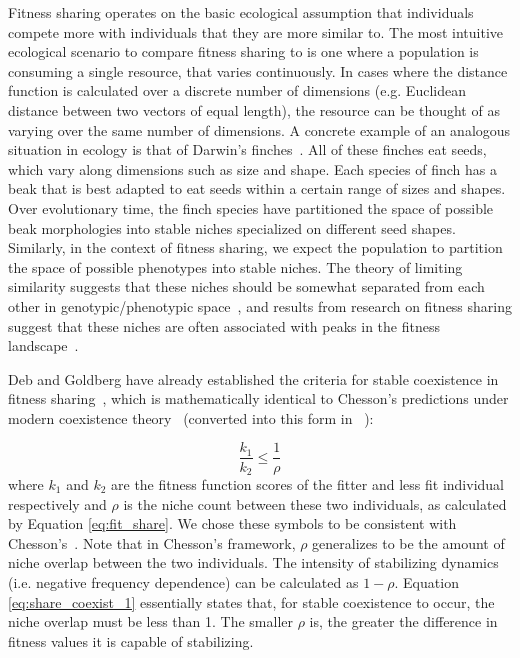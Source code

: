 Fitness sharing operates on the basic ecological assumption that individuals compete more with individuals that they are more similar to. The most intuitive ecological scenario to compare fitness sharing to is one where a population is consuming a single resource, that varies continuously. In cases where the distance function is calculated over a discrete number of dimensions (e.g. Euclidean distance between two vectors of equal length), the resource can be thought of as varying over the same number of dimensions. A concrete example of an analogous situation in ecology is that of Darwin's finches~\cite{schluter_ecological_1985}. All of these finches eat seeds, which vary along dimensions such as size and shape. Each species of finch has a beak that is best adapted to eat seeds within a certain range of sizes and shapes. Over evolutionary time, the finch species have partitioned the space of possible beak morphologies into stable niches specialized on different seed shapes. Similarly, in the context of fitness sharing, we expect the population to partition the space of possible phenotypes into stable niches. The theory of limiting similarity suggests that these niches should be somewhat separated from each other in genotypic/phenotypic space~\cite{pacala_limiting_1994}, and results from research on fitness sharing suggest that these niches are often associated with peaks in the fitness landscape~\cite{goldberg_genetic_1987}. 


Deb and Goldberg have already established the criteria for stable coexistence in fitness sharing~\cite{deb_investigation_1989}, which is mathematically identical to Chesson's predictions under modern coexistence theory~\cite{chesson_mechanisms_2000} (converted into this form in ~\cite{letten_linking_2017}):

\begin{equation}
\frac{k_1}{k_2} \leq \frac{1}{\rho}
\label{eq:share_coexist_1}
\end{equation}
where $k_1$ and $k_2$ are the fitness function scores of the fitter and less fit individual respectively and $\rho$ is the niche count between these two individuals, as calculated by Equation \ref{eq:fit_share}. We chose these symbols to be consistent with Chesson's~\cite{chesson_mechanisms_2000}. Note that in Chesson's framework, $\rho$ generalizes to be the amount of niche overlap between the two individuals. The intensity of stabilizing dynamics (i.e. negative frequency dependence) can be calculated as $1-\rho$. Equation \ref{eq:share_coexist_1} essentially states that, for stable coexistence to occur, the niche overlap must be less than 1. The smaller $\rho$ is, the greater the difference in fitness values it is capable of stabilizing.


